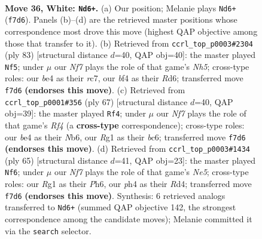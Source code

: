 \documentclass[11pt]{article}
\begin{document}
\clearpage

\begin{figure}[p]\centering
\begin{subfigure}{0.46\textwidth}\centering
\resizebox{\linewidth}{!}{%
\newchessgame
\chessboard[
  setfen={r1k3n1/3n1N2/8/6p1/4bb1p/7P/1p3KP1/6R1 w - - 0 36},
  showmover=false,
  pgfstyle=straightmove, color=movearrow, markmove={f7-d6}
]}
\caption{}
\end{subfigure}\hfill
\begin{subfigure}{0.46\textwidth}\centering
\resizebox{\linewidth}{!}{%
\newchessgame
\chessboard[
  setfen={8/2R1p3/3r1ppk/p7/P1B4n/1P3P2/4K2P/8 b - - 1 42},
  showmover=false,
  pgfstyle=straightmove, color=movearrow, markmove={h4-f5}
]}
\caption{}
\end{subfigure}
\\[4pt]
\begin{subfigure}{0.46\textwidth}\centering
\resizebox{\linewidth}{!}{%
\newchessgame
\chessboard[
  setfen={3k4/p6p/1nBP2p1/2p2r2/P7/5P2/3K2P1/3R4 b - - 0 34},
  showmover=false,
  pgfstyle=straightmove, color=movearrow, markmove={f5-f4}
]}
\caption{}
\end{subfigure}\hfill
\begin{subfigure}{0.46\textwidth}\centering
\resizebox{\linewidth}{!}{%
\newchessgame
\chessboard[
  setfen={8/p4pk1/7p/7B/3rnP2/6P1/P6P/4R1K1 b - - 0 33},
  showmover=false,
  pgfstyle=straightmove, color=movearrow, markmove={e4-f6}
]}
\caption{}
\end{subfigure}
\caption{\textbf{Move 36, White: \texttt{Nd6+}.} (a) Our position; Melanie plays \texttt{Nd6+} (\texttt{f7d6}). Panels (b)--(d) are the retrieved master positions whose correspondence most drove this move (highest QAP objective among those that transfer to it). (b) Retrieved from \texttt{ccrl\_top\_p0003\#2304} (ply 83) [structural distance $d$=40, QAP obj=40]: the master played \texttt{Nf5}; under $\mu$ our \emph{Nf7} plays the role of that game's \emph{Nh5}; cross-type roles: our \emph{b}e4 as their \emph{r}c7, our \emph{b}f4 as their \emph{R}d6; transferred move \texttt{f7d6} \textbf{(endorses this move)}. (c) Retrieved from \texttt{ccrl\_top\_p0001\#356} (ply 67) [structural distance $d$=40, QAP obj=39]: the master played \texttt{Rf4}; under $\mu$ our \emph{Nf7} plays the role of that game's \emph{Rf4} (a \textbf{cross-type} correspondence); cross-type roles: our \emph{b}e4 as their \emph{N}b6, our \emph{R}g1 as their \emph{b}c6; transferred move \texttt{f7d6} \textbf{(endorses this move)}. (d) Retrieved from \texttt{ccrl\_top\_p0003\#1434} (ply 65) [structural distance $d$=41, QAP obj=23]: the master played \texttt{Nf6}; under $\mu$ our \emph{Nf7} plays the role of that game's \emph{Ne5}; cross-type roles: our \emph{R}g1 as their \emph{P}h6, our \emph{p}h4 as their \emph{R}d4; transferred move \texttt{f7d6} \textbf{(endorses this move)}. Synthesis: 6 retrieved analogs transferred to \texttt{Nd6+} (summed QAP objective 142, the strongest correspondence among the candidate moves); Melanie committed it via the \texttt{search} selector.}
\label{fig:thought-m70}
\end{figure}
\end{document}
